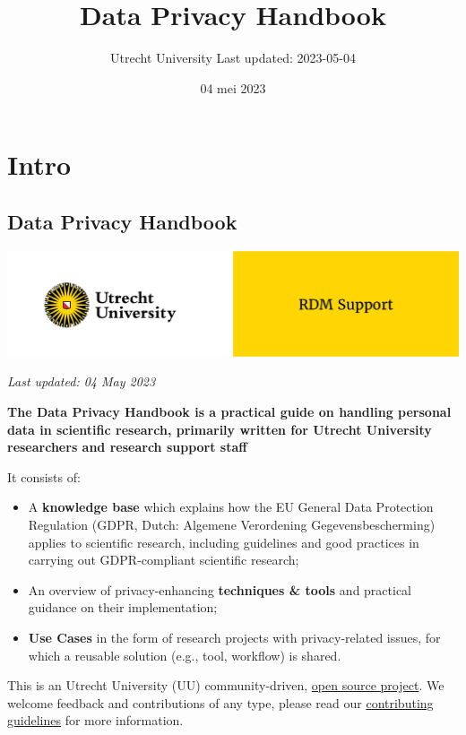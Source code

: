 \documentclass[
]{book}
\title{Data Privacy Handbook}
\author{Utrecht University \textbar{} Last updated: 2023-05-04}
\date{04 mei 2023}
\providecommand{\tightlist}{%
  \setlength{\itemsep}{0pt}\setlength{\parskip}{0pt}}
\begin{document}
\maketitle

{
\setcounter{tocdepth}{1}
\tableofcontents
}
\hypertarget{part-intro}{%
\part*{Intro}\label{part-intro}}

\hypertarget{data-privacy-handbook}{%
\chapter*{Data Privacy Handbook}\label{data-privacy-handbook}}

\includegraphics{img/cover-image-dph.png}

\emph{Last updated: 04 May 2023}

\textbf{The Data Privacy Handbook is a practical guide on handling personal data in
scientific research, primarily written for Utrecht University researchers and
research support staff}

It consists of:

\begin{itemize}
\tightlist
\item
  A \textbf{knowledge base} which explains how the EU General Data Protection
  Regulation (GDPR, Dutch: Algemene Verordening Gegevensbescherming) applies to
  scientific research, including guidelines and good practices in carrying out
  GDPR-compliant scientific research;
\item
  An overview of privacy-enhancing \textbf{techniques \& tools} and practical guidance
  on their implementation;
\item
  \textbf{Use Cases} in the form of research projects with privacy-related issues,
  for which a reusable solution (e.g., tool, workflow) is shared.
\end{itemize}

This is an Utrecht University (UU) community-driven,
\href{https://github.com/UtrechtUniversity/dataprivacyhandbook}{open source project}.
We welcome feedback and contributions of any type, please read our
\href{https://github.com/UtrechtUniversity/dataprivacyhandbook/blob/main/CONTRIBUTING.md}{contributing guidelines}
for more information.
\end{document}
